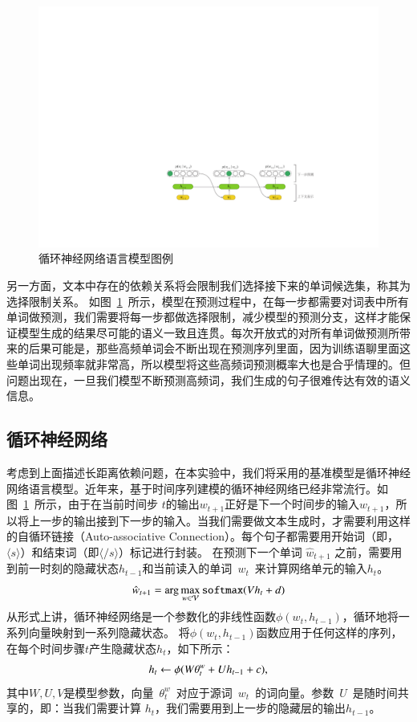 \begin{figure}[!b]
  \centering
  \includegraphics[width=.99\columnwidth]{./figures/lm.pdf}
  \caption{循环神经网络语言模型图例}
  \label{fig:lm}
\end{figure}

另一方面，文本中存在的依赖关系将会限制我们选择接下来的单词候选集，称其为选择限制关系。
如图~\ref{fig:lm}~所示，模型在预测过程中，在每一步都需要对词表中所有单词做预测，我们需要将每一步都做选择限制，减少模型的预测分支，这样才能保证模型生成的结果尽可能的语义一致且连贯。每次开放式的对所有单词做预测所带来的后果可能是，那些高频单词会不断出现在预测序列里面，因为训练语聊里面这些单词出现频率就非常高，所以模型将这些高频词预测概率大也是合乎情理的。但问题出现在，一旦我们模型不断预测高频词，我们生成的句子很难传达有效的语义信息。

\subsection{循环神经网络}
考虑到上面描述长距离依赖问题，在本实验中，我们将采用的基准模型是循环神经网络语言模型。近年来，基于时间序列建模的循环神经网络已经非常流行。如图~\ref{fig:lm}~所示，由于在当前时间步 $t$的输出$w_{t+1}$正好是下一个时间步的输入$w_{t+1}$，所以将上一步的输出接到下一步的输入。当我们需要做文本生成时，才需要利用这样的自循环链接（Auto-associative Connection）。每个句子都需要用开始词（即，$\langle s\rangle$）和结束词（即$\langle / s\rangle$）标记进行封装。 在预测下一个单词 $\hat w_{t+1}$ 之前，需要用到前一时刻的隐藏状态$h_{t-1}$和当前读入的单词~$w_t$~来计算网络单元的输入$h_t$。
\begin{equation}
\setlength{\abovedisplayskip}{10pt}
\setlength{\belowdisplayskip}{10pt}
  \hat w_{t+1}=\arg\max_{w\in\mathcal{V}} \mathtt{softmax}(Vh_t+d)
\end{equation}
从形式上讲，循环神经网络是一个参数化的非线性函数$\phi(w_t,h_{t-1})$，循环地将一系列向量映射到一系列隐藏状态。 将$\phi(w_t,h_{t-1})$函数应用于任何这样的序列，在每个时间步骤$t$产生隐藏状态$h_t$，如下所示：
\begin{equation}
\setlength{\abovedisplayskip}{10pt}
\setlength{\belowdisplayskip}{10pt}
  h_t \leftarrow  \phi(W\theta^w_t + U h_{t-1} +c),
\end{equation}
其中$ W,U,V $是模型参数，向量~$\theta^w_t$~对应于源词~$w_t$~的词向量。参数~$U$~是随时间共享的，即：当我们需要计算 $h_t$，我们需要用到上一步的隐藏层的输出$h_{t-1}$。

